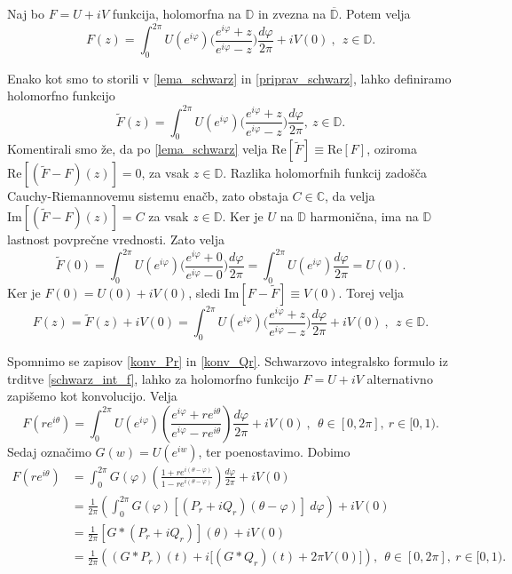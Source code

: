 \documentclass[mat1, tisk]{fmfdelo}
\begin{document}
    \begin{trditev}
        \label{schwarz_int_f}
        Naj bo $F = U + iV$ funkcija, holomorfna na $\mathbb{D}$ in zvezna na $\overline{\mathbb{D}}$. Potem velja
        $$ 
            F(z) = \int_{0}^{2 \pi}{U(e^{i \varphi})\bigg(\frac{e^{i\varphi}+z}{e^{i\varphi}-z}\bigg)\frac{d \varphi}{2 \pi}} + i V(0)~,~~z \in \mathbb{D}.
        $$
    \end{trditev}
    \begin{dokaz}
        Enako kot smo to storili v \eqref{lema_schwarz} in \eqref{priprav_schwarz}, lahko definiramo holomorfno funkcijo
        $$
        \widetilde{F}(z) = \int_{0}^{2 \pi}{U(e^{i \varphi})\bigg(\frac{e^{i\varphi}+z}{e^{i\varphi}-z}\bigg)\frac{d \varphi}{2 \pi}},~z \in \mathbb{D}.
        $$
        Komentirali smo že, da po \eqref{lema_schwarz} velja $\text{Re}[\widetilde{F}] \equiv \text{Re}[F]$, oziroma $\text{Re}[(\widetilde{F} - F)(z)] = 0$, za vsak $z \in \mathbb{D}$. 
        Razlika holomorfnih funkcij zadošča Cauchy-Riemannovemu sistemu enačb, zato obstaja $C \in \mathbb{C}$, da velja $\text{Im}[(\widetilde{F} - F)(z)] = C$ za vsak $z \in \mathbb{D}$.
        Ker je $U$ na $\mathbb{D}$ harmonična, ima na $\mathbb{D}$ lastnost povprečne vrednosti. Zato velja
        $$
        \widetilde{F}(0) = \int_{0}^{2 \pi}{U(e^{i \varphi})\bigg(\frac{e^{i\varphi}+0}{e^{i\varphi}-0}\bigg)\frac{d \varphi}{2 \pi}} = \int_{0}^{2 \pi}{U(e^{i \varphi})\frac{d \varphi}{2 \pi}} = U(0).
        $$
        Ker je $F(0) = U(0) + iV(0)$, sledi $\text{Im}[F - \widetilde{F}] \equiv V(0)$.
        Torej velja
        $$ 
        F(z) = \widetilde{F}(z) + iV(0) = \int_{0}^{2 \pi}{U(e^{i \varphi})\bigg(\frac{e^{i\varphi}+z}{e^{i\varphi}-z}\bigg)\frac{d \varphi}{2 \pi}} + i V(0)~,~~z \in \mathbb{D}.
        $$
    \end{dokaz}

    Spomnimo se zapisov \eqref{konv_Pr} in \eqref{konv_Qr}. Schwarzovo integralsko formulo iz trditve \ref{schwarz_int_f}, lahko za holomorfno funkcijo $F = U + iV$ alternativno zapišemo kot konvolucijo. Velja
    $$
        F(r e^{i \theta}) = \int_{0}^{2 \pi}{U(e^{i \varphi})\left(\frac{e^{i \varphi}+r e^{i \theta}}{e^{i \varphi}-r e^{i \theta}}\right)\frac{d \varphi}{2 \pi}} + i V(0)~,~~\theta \in [0,2 \pi],~r \in [0,1).
    $$
    Sedaj označimo $G(w) = U(e^{iw})$, ter poenostavimo. Dobimo
    \begin{align*}
        F(r e^{i \theta}) & = \int_{0}^{2 \pi}{G(\varphi)\left(\frac{1 +r e^{i (\theta-\varphi)}}{1-r e^{i(\theta-\varphi)}}\right)}\frac{d\varphi}{2 \pi} + iV(0)\\
        & = \frac{1}{2 \pi} \left(\int_{0}^{2 \pi}{G(\varphi)[(P_r + i Q_r)(\theta - \varphi)]}~d\varphi\right)+  iV(0) \\
        & = \frac{1}{2 \pi} \left[G * (P_r + iQ_r)\right](\theta) + iV(0)\\
        & = \frac{1}{2 \pi}\left((G * P_r)(t) + i\big[(G * Q_r)(t) + 2 \pi V(0)\big]\right),~~\theta\in [0,2 \pi],~r \in [0,1).
    \end{align*}
\end{document}
